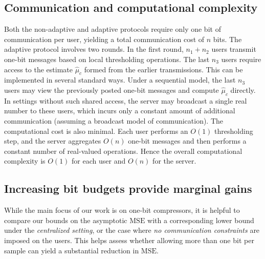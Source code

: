 \documentclass[10pt]{article} %
\theoremstyle{plain}
\theoremstyle{definition}
\theoremstyle{remark}
\newcommand{\mse}{\mathrm{MSE}}
\newcommand{\rkcomment}[1]{\textcolor{blue}{RK: #1}}
\begin{document}
\subsection{Communication and computational complexity}
Both the non-adaptive and adaptive protocols require only one bit of communication per user, yielding a total communication cost of $n$ bits. The adaptive protocol involves two rounds.  In the first round, $n_1+n_2$ users transmit one-bit messages based  on local thresholding operations. The last $n_3$ users require access to the estimate $\hat{\mu}_c$ formed from the earlier transmissions.  This can be implemented in several standard ways.  Under a sequential model, the last $n_3$ users may view the previously posted one-bit messages and compute $\hat{\mu}_c$ directly. In settings without such shared access, the server may broadcast a single real number to these users, which incurs only a constant amount of additional communication (assuming a broadcast model of communication). The computational cost is also minimal. Each user performs an $O(1)$ thresholding step, and the server aggregates $O(n)$ one-bit messages and then performs a constant number of real-valued operations. Hence the overall computational complexity is $O(1)$ for each user and $O(n)$ for the server.



\subsection{Increasing bit budgets provide marginal gains}\label{sec:increase_bitbudget}

While the main focus of our work is on one-bit compressors, it is helpful to compare our bounds on the asymptotic $\mse$ with a corresponding lower bound under the \emph{centralized setting}, or the case where \emph{no communication constraints} are imposed on the users. This helps assess whether allowing more than one bit per sample can yield a substantial reduction in $\mse$. 
\end{document}

